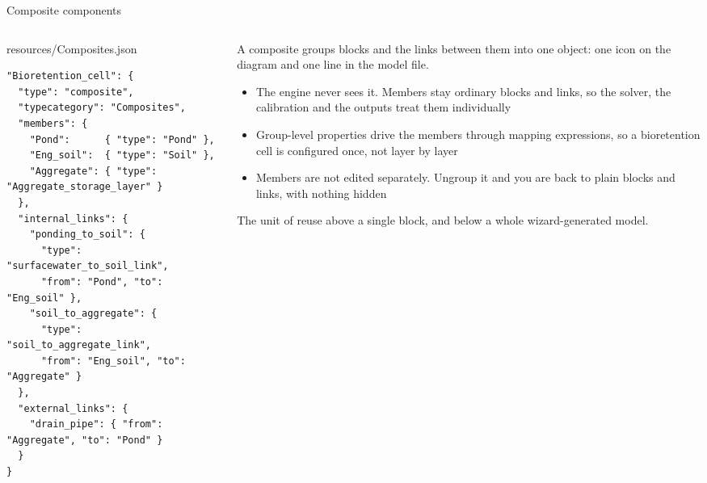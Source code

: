 \documentclass[aspectratio=169, 10pt]{beamer}
\begin{document}
\begin{frame}[fragile]{Composite components}
  \begin{columns}[T,onlytextwidth]
    \begin{column}{0.49\textwidth}
      {\tiny\color{ohqgrey}\ttfamily resources/Composites.json}
      \vspace{-1pt}
\begin{lstlisting}[style=ohqjsonstyle]
"Bioretention_cell": {
  "type": "composite",
  "typecategory": "Composites",
  "members": {
    "Pond":      { "type": "Pond" },
    "Eng_soil":  { "type": "Soil" },
    "Aggregate": { "type": "Aggregate_storage_layer" }
  },
  "internal_links": {
    "ponding_to_soil": {
      "type": "surfacewater_to_soil_link",
      "from": "Pond", "to": "Eng_soil" },
    "soil_to_aggregate": {
      "type": "soil_to_aggregate_link",
      "from": "Eng_soil", "to": "Aggregate" }
  },
  "external_links": {
    "drain_pipe": { "from": "Aggregate", "to": "Pond" }
  }
}
\end{lstlisting}
    \end{column}
    \begin{column}{0.48\textwidth}
      A \alert{composite} groups blocks and the links between them into one
      object: one icon on the diagram and one line in the model file.
      \begin{itemize}\setlength\itemsep{2pt}
        \item The engine never sees it. Members stay ordinary blocks and links,
              so the solver, the calibration and the outputs treat them
              individually
        \item Group-level properties drive the members through mapping
              expressions, so a bioretention cell is configured once, not
              layer by layer
        \item Members are not edited separately. \alert{Ungroup} it and you are
              back to plain blocks and links, with nothing hidden
      \end{itemize}
      \vspace{0.3em}
      {\scriptsize The unit of reuse above a single block, and below a whole
      wizard-generated model.}
    \end{column}
  \end{columns}
\end{frame}
\end{document}
